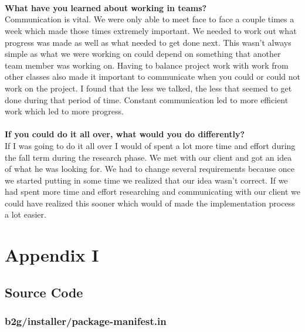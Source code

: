 \documentclass[12pt]{article}
\begin{document}
\\\\\\
\textbf{What have you learned about working in teams?}\\
Communication is vital. We were only able to meet face to face a couple times a week which made those times extremely important. We needed to work out what progress was made as well as what needed to get done next.  This wasn't always simple as what we were working on could depend on something that another team member was working on.  Having to balance project work with work from other classes also made it important to communicate when you could or could not work on the project.  I found that the less we talked, the less that seemed to get done during that period of time.  Constant communication led to more efficient work which led to more progress.   
\\\\
\textbf{If you could do it all over, what would you do differently?}\\
If I was going to do it all over I would of spent a lot more time and effort during the fall term during the research phase.  We met with our client and got an idea of what he was looking for. We had to change several requirements because once we started putting in some time we realized that our idea wasn't correct.  If we had spent more time and effort researching and communicating with our client we could have realized this sooner which would of made the implementation process a lot easier.  
\pagebreak

\section{Appendix I}
\subsection{Source Code}

\subsubsection{b2g/installer/package-manifest.in}

\pagebreak
\end{document}
